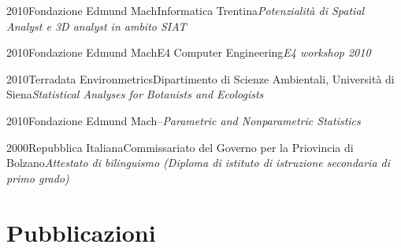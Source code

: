 \documentclass{curriculum}
\begin{document}
    \begin{entrylist}
    \entry
        {2010}{Fondazione Edmund Mach}{Informatica Trentina}{\emph{Potenzialità di Spatial Analyst e 3D analyst in ambito SIAT}}
    \end{entrylist} 
        
    \begin{entrylist}
    \entry
        {2010}{Fondazione Edmund Mach}{E4 Computer Engineering}{\emph{E4 workshop 2010}}
    \end{entrylist}
    
    \begin{entrylist}
    \entry
        {2010}{Terradata Environmetrics}{Dipartimento di Scienze Ambientali, Università di Siena}{\emph{Statistical Analyses for Botanists and Ecologists}}
    \end{entrylist}
    
    \begin{entrylist}
    \entry
        {2010}{Fondazione Edmund Mach}{--}{\emph{Parametric and Nonparametric Statistics}}
    \end{entrylist}
    
    \begin{entrylist}
    \entry
        {2000}{Repubblica Italiana}{Commissariato del Governo per la Priovincia di Bolzano}{\emph{Attestato di bilinguismo (Diploma di istituto di istruzione secondaria di primo grado)}}
    \end{entrylist}
    
    \newpage
    \section{Pubblicazioni}
    \vspace{-0.5 cm}
    \begin{refsection}
        \nocite{*}
        \newrefcontext[sorting=ydnt]
        \printbibliography[type=article, title={Riviste peer-review}, heading=subbibliography, notkeyword=divulgative]
    \end{refsection}
 
    \begin{refsection}
        \nocite{*}
        \newrefcontext[sorting=ydnt]
        \printbibliography[type=incollection, notkeyword=report, title={Capitoli di libro}, heading=subbibliography]
    \end{refsection}

    \begin{refsection}
        \nocite{*}
        \newrefcontext[sorting=ydnt]
        \printbibliography[type=inproceedings, title={Atti di convegno}, heading=subbibliography]
    \end{refsection}
    
\end{document}
